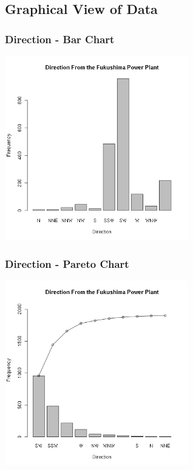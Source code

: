\subsection{Graphical View of Data}

\begin{frame}
  \frametitle{Direction - Bar Chart}

  \begin{center}
    \includegraphics[width=8cm]{img/fukushimaDirectionBarPlot}
  \end{center}

\end{frame}

\begin{frame}
  \frametitle{Direction - Pareto Chart}

  \begin{center}
    \includegraphics[width=8cm]{img/fukushimaParetoDirection}
  \end{center}

\end{frame}


